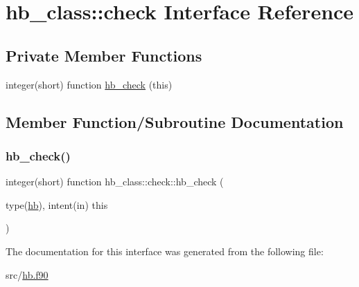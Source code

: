 \hypertarget{interfacehb__class_1_1check}{}\section{hb\+\_\+class\+:\+:check Interface Reference}
\label{interfacehb__class_1_1check}
\subsection*{Private Member Functions}
\begin{DoxyCompactItemize}
\item 
integer(short) function \hyperlink{interfacehb__class_1_1check_af3a0cc17992c073f36b86211a97625a2}{hb\+\_\+check} (this)
\end{DoxyCompactItemize}


\subsection{Member Function/\+Subroutine Documentation}
\mbox{\label{interfacehb__class_1_1check_af3a0cc17992c073f36b86211a97625a2}} 
\subsubsection{\texorpdfstring{hb\+\_\+check()}{hb\_check()}}
{\footnotesize\ttfamily integer(short) function hb\+\_\+class\+::check\+::hb\+\_\+check (\begin{DoxyParamCaption}\item[{type(\hyperlink{structhb__class_1_1hb}{hb}), intent(in)}]{this }\end{DoxyParamCaption})\hspace{0.3cm}{\ttfamily [private]}}



The documentation for this interface was generated from the following file\+:\begin{DoxyCompactItemize}
\item 
src/\hyperlink{hb_8f90}{hb.\+f90}\end{DoxyCompactItemize}
